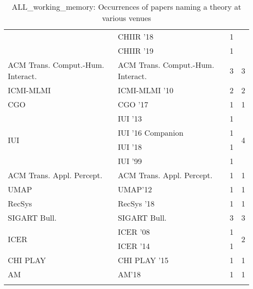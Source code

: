 \begin{table*}[t]
\begin{tabular}{llrr}
& CHIIR '18 & 1 &\\
& CHIIR '19 & 1 &\\
\multirow{1}{*}{ACM Trans. Comput.-Hum. Interact.} & ACM Trans. Comput.-Hum. Interact. & 3 & \multirow{1}{*}{3}\\
\multirow{1}{*}{ICMI-MLMI } & ICMI-MLMI '10 & 2 & \multirow{1}{*}{2}\\
\multirow{1}{*}{CGO } & CGO '17 & 1 & \multirow{1}{*}{1}\\
\multirow{4}{*}{IUI } & IUI '13 & 1 & \multirow{4}{*}{4}\\
& IUI '16 Companion & 1 &\\
& IUI '18 & 1 &\\
& IUI '99 & 1 &\\
\multirow{1}{*}{ACM Trans. Appl. Percept.} & ACM Trans. Appl. Percept. & 1 & \multirow{1}{*}{1}\\
\multirow{1}{*}{UMAP} & UMAP'12 & 1 & \multirow{1}{*}{1}\\
\multirow{1}{*}{RecSys } & RecSys '18 & 1 & \multirow{1}{*}{1}\\
\multirow{1}{*}{SIGART Bull.} & SIGART Bull. & 3 & \multirow{1}{*}{3}\\
\multirow{2}{*}{ICER } & ICER '08 & 1 & \multirow{2}{*}{2}\\
& ICER '14 & 1 &\\
\multirow{1}{*}{CHI PLAY } & CHI PLAY '15 & 1 & \multirow{1}{*}{1}\\
\multirow{1}{*}{AM} & AM'18 & 1 & \multirow{1}{*}{1}\\
\caption{ALL_working_memory: Occurrences of papers naming a theory at various venues}
\end{tabular}
\end{table*}